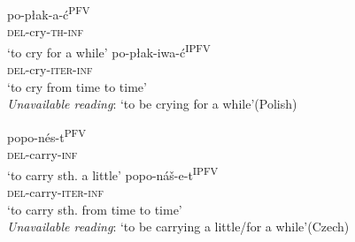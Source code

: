 \documentclass[output=paper,colorlinks,citecolor=brown]{langscibook}
\begin{document}
\ea\label{biskup:ex:del2-pol}\ea\gll po-płak-a-ć\textsuperscript{PFV}\\
\textsc{del}-cry-\textsc{th-inf}\\
\glt ‘to cry for a while’ \label{biskup:ex:del2-pol.a}
\ex\gll po-płak-iwa-ć\textsuperscript{IPFV}\\
\textsc{del}-cry-\textsc{iter-inf}\\
\glt ‘to cry from time to time’\\ \textit{Unavailable reading}: ‘to be crying for a while’\hfill (Polish)\label{biskup:ex:del2-pol.b}
\z\z

\ea\label{biskup:ex:del2-cz}\ea\gll popo-nés-t\textsuperscript{PFV}\\
\textsc{del}-carry-\textsc{inf}\\
\glt ‘to carry sth. a little’\label{biskup:ex:del2-cz.a}
\ex\gll popo-náš-e-t\textsuperscript{IPFV}\\
\textsc{del}-carry-\textsc{iter-inf}\\
\glt ‘to carry sth. from time to time’\\ \textit{Unavailable reading}: ‘to be carrying a little/for a while’\hfill (Czech)\label{biskup:ex:del2-cz.b}
\z\z
\end{document}
